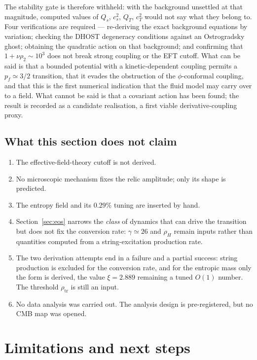 \documentclass[a4paper,11pt]{article}
\begin{document}
The stability gate is therefore withheld: with the background unsettled at that magnitude, computed values of $Q_s$, $c_s^2$, $Q_T$, $c_T^2$ would not say what they belong to. Four verifications are required --- re-deriving the exact background equations by variation; checking the DHOST degeneracy conditions against an Ostrogradsky ghost; obtaining the quadratic action on that background; and confirming that $1+\nu\rho_2\sim10^3$ does not break strong coupling or the EFT cutoff. What can be said is that a bounded potential with a kinetic-dependent coupling permits a $p_f\simeq3/2$ transition, that it evades the obstruction of the $\phi$-conformal coupling, and that this is the first numerical indication that the fluid model may carry over to a field. What cannot be said is that a covariant action has been found; the result is recorded as a candidate realisation, a first viable derivative-coupling proxy.

\subsection{What this section does not claim}

\begin{enumerate}
\item The effective-field-theory cutoff is not derived.
\item No microscopic mechanism fixes the relic amplitude; only its shape is predicted.
\item The entropy field and its $0.29\%$ tuning are inserted by hand.
\item Section~\ref{sec:eos} narrows the \emph{class} of dynamics that can drive the transition but does not fix the conversion rate: $\gamma\simeq26$ and $\rho_H$ remain inputs rather than quantities computed from a string-excitation production rate.
\item The two derivation attempts end in a failure and a partial success: string production is excluded for the conversion rate, and for the entropic mass only the form is derived, the value $\xi=2.889$ remaining a tuned $O(1)$ number. The threshold $\rho_{\mathrm{tr}}$ is still an input.
\item No data analysis was carried out. The analysis design is pre-registered, but no CMB map was opened.
\end{enumerate}

\section{Limitations and next steps}
\end{document}
